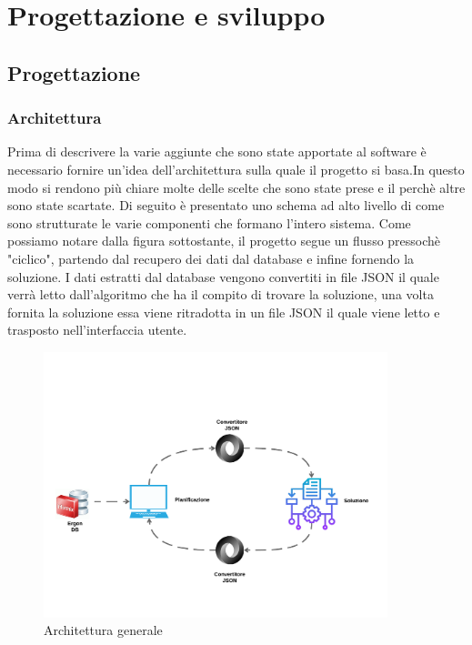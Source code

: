 
\chapter{Progettazione e sviluppo}
\label{cap:progettazione}

\section{Progettazione}
\subsection{Architettura}

Prima di descrivere la varie aggiunte che sono state apportate al software è necessario fornire un'idea dell'architettura sulla quale il progetto si basa.In questo modo si 
rendono più chiare molte delle scelte che sono state prese e il perchè altre sono state scartate. Di seguito è presentato uno schema ad alto livello di come sono strutturate le
varie componenti che formano l'intero sistema. Come possiamo notare dalla figura sottostante, il progetto segue un flusso pressochè "ciclico", partendo dal recupero dei dati dal
database e infine fornendo la soluzione. I dati estratti dal database vengono convertiti in file JSON il quale verrà letto dall'algoritmo che ha il compito di trovare la soluzione,
una volta fornita la soluzione essa viene ritradotta in un file JSON il quale viene letto e trasposto nell'interfaccia utente.

\begin{figure}[H]
	\includegraphics[width=10cm]{immagini/architettura.png}
	\centering
	\caption{Architettura generale}
\end{figure}


